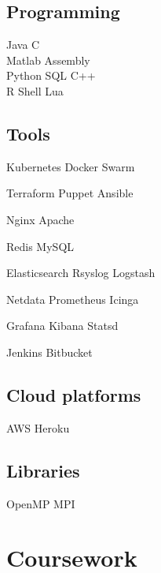 \documentclass[]{deedy-resume-openfont}
\begin{document}
\begin{minipage}[t]{0.33\textwidth}
\subsection{Programming}
\textbullet{} Java  \textbullet{} C \\
\textbullet{} Matlab \textbullet{} Assembly \\ %
\textbullet{} Python \textbullet{} SQL \textbullet{} C++ \\
\textbullet{} R \textbullet{} Shell \textbullet{} Lua
\sectionsep

\subsection{Tools}
\textbullet{} Kubernetes \textbullet{} Docker Swarm

\textbullet{} Terraform \textbullet{} Puppet \textbullet{} Ansible

\textbullet{} Nginx \textbullet{} Apache

\textbullet{} Redis \textbullet{} MySQL

\textbullet{} Elasticsearch \textbullet{} Rsyslog \textbullet{} Logstash

\textbullet{} Netdata \textbullet{} Prometheus \textbullet{} Icinga

\textbullet{} Grafana \textbullet{} Kibana \textbullet{} Statsd

\textbullet{} Jenkins \textbullet{} Bitbucket
\sectionsep

\subsection{Cloud platforms}
\textbullet{} AWS \textbullet{} Heroku
\sectionsep

\subsection{Libraries}
\textbullet{} OpenMP \textbullet{} MPI
\sectionsep


\section{Coursework}

\end{minipage}
\end{document}
